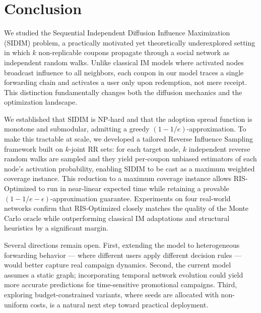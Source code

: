 \documentclass[sigconf]{acmart}
\begin{document}
\section{Conclusion}

We studied the Sequential Independent Diffusion Influence Maximization (SIDIM) problem, a practically motivated yet theoretically underexplored setting in which $k$ non-replicable coupons propagate through a social network as independent random walks. Unlike classical IM models where activated nodes broadcast influence to all neighbors, each coupon in our model traces a single forwarding chain and activates a user only upon redemption, not mere receipt. This distinction fundamentally changes both the diffusion mechanics and the optimization landscape.

We established that SIDIM is NP-hard and that the adoption spread function is monotone and submodular, admitting a greedy $(1-1/e)$-approximation. To make this tractable at scale, we developed a tailored Reverse Influence Sampling framework built on $k$-joint RR sets: for each target node, $k$ independent reverse random walks are sampled and they yield per-coupon unbiased estimators of each node's activation probability, enabling SIDIM to be cast as a maximum weighted coverage instance. This reduction to a maximum coverage instance allows RIS-Optimized to run in near-linear expected time while retaining a provable $(1-1/e-\epsilon)$-approximation guarantee. Experiments on four real-world networks confirm that RIS-Optimized closely matches the quality of the Monte Carlo oracle while outperforming classical IM adaptations and structural heuristics by a significant margin.

Several directions remain open. First, extending the model to heterogeneous forwarding behavior --- where different users apply different decision rules --- would better capture real campaign dynamics. Second, the current model assumes a static graph; incorporating temporal network evolution could yield more accurate predictions for time-sensitive promotional campaigns. Third, exploring budget-constrained variants, where seeds are allocated with non-uniform costs, is a natural next step toward practical deployment.

\begin{acks}
\end{acks}



\end{document}
